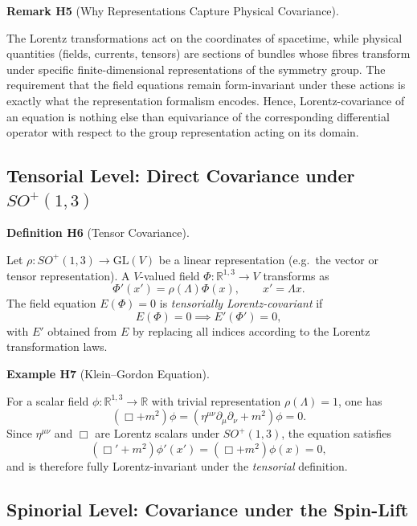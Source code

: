 \documentclass[10pt, letterpaper]{article}
\newcommand{\R}{\mathbb{R}}
\newcommand{\GL}{\mathrm{GL}}
\newcommand{\CustomHeading}[3]{%
  \par\medskip\noindent%
  \textbf{#1 #2} \textnormal{(#3)}.\enskip%
}
\newenvironment{DEF}[2]{\begin{unitbox}\CustomHeading{Definition}{#1}{#2}}{\end{unitbox}}
\newenvironment{REM}[2]{\begin{unitbox}\CustomHeading{Remark}{#1}{#2}}{\end{unitbox}}
\newenvironment{EXA}[2]{\begin{unitbox}\CustomHeading{Example}{#1}{#2}}{\end{unitbox}}
\begin{document}
\begin{REM}{H5}{Why Representations Capture Physical Covariance}
The Lorentz transformations act on the coordinates of spacetime, while physical quantities (fields, currents, tensors) are sections of bundles whose fibres transform under specific finite-dimensional representations of the symmetry group.  
The requirement that the field equations remain form-invariant under these actions is exactly what the representation formalism encodes.  
Hence, Lorentz-covariance of an equation is nothing else than equivariance of the corresponding differential operator with respect to the group representation acting on its domain.
\end{REM}

\subsection{Tensorial Level: Direct Covariance under \texorpdfstring{$SO^+(1,3)$}{SO+(1,3)}}

\begin{DEF}{H6}{Tensor Covariance}
Let $\rho:SO^+(1,3)\to \GL(V)$ be a linear representation (e.g.\ the vector or tensor representation).  
A $V$-valued field $\Phi:\R^{1,3}\to V$ transforms as
\[
\Phi'(x') = \rho(\Lambda)\Phi(x),\qquad x'=\Lambda x.
\]
The field equation $E(\Phi)=0$ is \emph{tensorially Lorentz-covariant} if
\[
E(\Phi)=0 \implies E'(\Phi')=0,
\]
with $E'$ obtained from $E$ by replacing all indices according to the Lorentz transformation laws.
\end{DEF}

\begin{EXA}{H7}{Klein--Gordon Equation}
For a scalar field $\phi:\R^{1,3}\to\R$ with trivial representation $\rho(\Lambda)=1$, one has
\[
(\Box+m^2)\phi = (\eta^{\mu\nu}\partial_\mu\partial_\nu+m^2)\phi = 0.
\]
Since $\eta^{\mu\nu}$ and $\Box$ are Lorentz scalars under $SO^+(1,3)$, the equation satisfies
\[
(\Box'+m^2)\phi'(x')=(\Box+m^2)\phi(x)=0,
\]
and is therefore fully Lorentz-invariant under the \emph{tensorial} definition.
\end{EXA}

\subsection{Spinorial Level: Covariance under the Spin-Lift}
\end{document}
